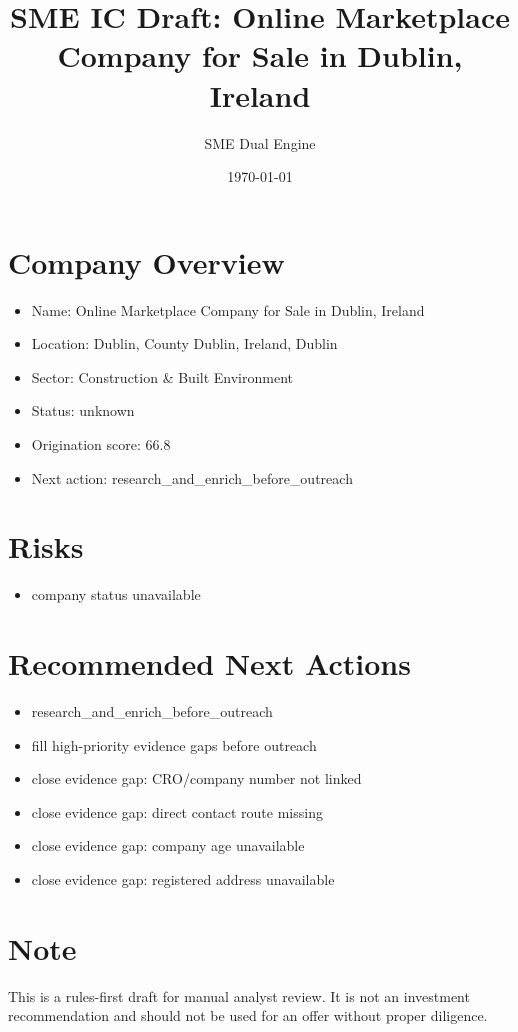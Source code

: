 \documentclass[11pt,a4paper]{article}
\title{SME IC Draft: Online Marketplace Company for Sale in Dublin, Ireland}
\author{SME Dual Engine}
\date{\today}
\begin{document}
\maketitle
\section*{Company Overview}
\begin{itemize}[leftmargin=1.4em]
\item Name: Online Marketplace Company for Sale in Dublin, Ireland
\item Location: Dublin, County Dublin, Ireland, Dublin
\item Sector: Construction \& Built Environment
\item Status: unknown
\item Origination score: 66.8
\item Next action: research\_and\_enrich\_before\_outreach
\end{itemize}
\section*{Risks}
\begin{itemize}[leftmargin=1.4em]
\item company status unavailable
\end{itemize}
\section*{Recommended Next Actions}
\begin{itemize}[leftmargin=1.4em]
\item research\_and\_enrich\_before\_outreach
\item fill high-priority evidence gaps before outreach
\item close evidence gap: CRO/company number not linked
\item close evidence gap: direct contact route missing
\item close evidence gap: company age unavailable
\item close evidence gap: registered address unavailable
\end{itemize}
\section*{Note}
This is a rules-first draft for manual analyst review. It is not an investment
recommendation and should not be used for an offer without proper diligence.
\end{document}
